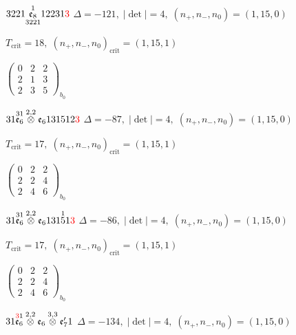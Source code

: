 \documentclass[10pt]{article}
\begin{document}
$3221\overset{1}{\underset{3221}{\mathfrak{e}_8}}12231\textcolor{red}{3}$ \quad $\Delta=-121,\; |\det|=4,\; (n_+,n_-,n_0)=(1,15,0)$

\hspace{1em}$T_{\text{crit}}=18,\; (n_+,n_-,n_0)_{\text{crit}}=(1,15,1)$

\hspace{2em}$\left(\begin{smallmatrix}0 & 2 & 2 \\ 2 & 1 & 3 \\ 2 & 3 & 5\end{smallmatrix}\right)_{\!b_0}$

\smallskip

$31\overset{31}{\mathfrak{e}_6}\overset{2,2}{\otimes}\mathfrak{e}_6131512\textcolor{red}{3}$ \quad $\Delta=-87,\; |\det|=4,\; (n_+,n_-,n_0)=(1,15,0)$

\hspace{1em}$T_{\text{crit}}=17,\; (n_+,n_-,n_0)_{\text{crit}}=(1,15,1)$

\hspace{2em}$\left(\begin{smallmatrix}0 & 2 & 2 \\ 2 & 2 & 4 \\ 2 & 4 & 6\end{smallmatrix}\right)_{\!b_0}$

\smallskip

$31\overset{31}{\mathfrak{e}_6}\overset{2,2}{\otimes}\mathfrak{e}_6131\overset{1}{5}1\textcolor{red}{3}$ \quad $\Delta=-86,\; |\det|=4,\; (n_+,n_-,n_0)=(1,15,0)$

\hspace{1em}$T_{\text{crit}}=17,\; (n_+,n_-,n_0)_{\text{crit}}=(1,15,1)$

\hspace{2em}$\left(\begin{smallmatrix}0 & 2 & 2 \\ 2 & 2 & 4 \\ 2 & 4 & 6\end{smallmatrix}\right)_{\!b_0}$

\smallskip

$31\overset{\textcolor{red}{3}1}{\mathfrak{e}_6}\overset{2,2}{\otimes}\mathfrak{e}_6\overset{3,3}{\otimes}\mathfrak{e}_7'1$ \quad $\Delta=-134,\; |\det|=4,\; (n_+,n_-,n_0)=(1,15,0)$
\end{document}
